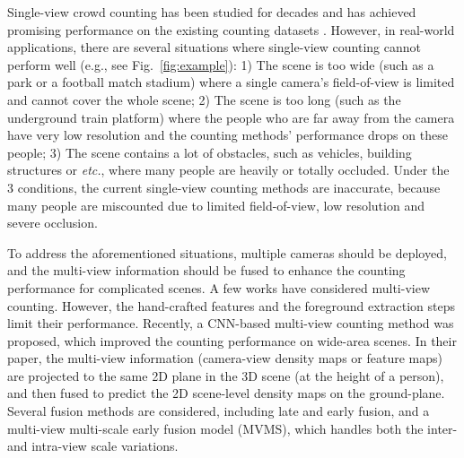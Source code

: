 \documentclass[letterpaper]{article} %
\newcommand{\citep}{\cite}
\begin{document}
Single-view crowd counting has been studied for decades and has achieved promising performance on the existing counting datasets \citep{zhang2015cross,Idrees2013Multi,zhang2016single,Chan2008Privacy,Chen2012Feature,idrees2018composition}. However, in real-world applications, there are several situations where single-view counting cannot perform well (e.g., see Fig.~\ref{fig:example}): 1) The scene is too wide (such as a park or a football match stadium) where a single camera's field-of-view is limited and cannot cover the whole scene; 2) The scene is too long (such as the underground train platform) where the people who are far away from the camera have very low resolution and the counting methods' performance drops on these people; 3) The scene contains a lot of obstacles, such as vehicles, building structures or \emph{etc.}, where many people are heavily or totally occluded. Under the 3 conditions, the current single-view counting methods are inaccurate, because many people are miscounted due to limited field-of-view, low resolution and severe occlusion.

To address the aforementioned situations, multiple cameras should be deployed, and the multi-view information should be fused to enhance the counting performance for complicated scenes. A few works \citep{li2012people,Ryan2014Scene,Tang2014Cross,Ge2010Crowd} have considered multi-view counting. However, the hand-crafted features and the foreground extraction steps limit their performance. %
Recently, a CNN-based multi-view counting method \citep{zhang2019wide} was proposed, which improved the counting performance on wide-area scenes.
In their paper, the multi-view information (camera-view density maps or feature maps) are projected to the same 2D plane in the 3D scene (at the height of a person), and then fused to predict the 2D scene-level density maps on the ground-plane. Several fusion methods are considered, including late and early fusion, and a multi-view multi-scale early fusion model (MVMS), which handles both the inter- and intra-view scale variations.
\end{document}

